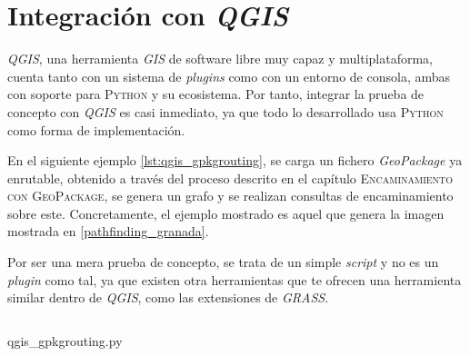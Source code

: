 \chapter{Integración con \textit{QGIS}}
\label{app:qgis_integration}

\textit{QGIS}, una herramienta \textit{GIS} de software libre muy capaz y multiplataforma, cuenta tanto con un sistema de \textit{plugins} como con un entorno de consola, ambas con soporte para \textsc{Python} y su ecosistema. Por tanto, integrar la prueba de concepto con \textit{QGIS} es casi inmediato, ya que todo lo desarrollado usa \textsc{Python} como forma de implementación.

En el siguiente ejemplo \autoref{lst:qgis_gpkgrouting}, se carga un fichero \textit{GeoPackage} ya enrutable, obtenido a través del proceso descrito en el capítulo \textsc{Encaminamiento con GeoPackage}, se genera un grafo y se realizan consultas de encaminamiento sobre este. Concretamente, el ejemplo mostrado es aquel que genera la imagen mostrada en \autoref{pathfinding_granada}.

Por ser una mera prueba de concepto, se trata de un simple \textit{script} y no es un \textit{plugin} como tal, ya que existen otra herramientas que te ofrecen una herramienta similar dentro de \textit{QGIS}, como las extensiones de \textit{GRASS}.

\begin{listing}[htbp]
	\inputminted[autogobble,
	frame=single,
	python3,
	linenos,
	numbersep=6pt,
	fontsize=\scriptsize,
	bgcolor=mintedbg,
	]{python}{qgis/qgis_gpkgrouting.py}
	\caption[Integración con QGIS]{qgis\_gpkgrouting.py}
	\label{lst:qgis_gpkgrouting}
\end{listing}